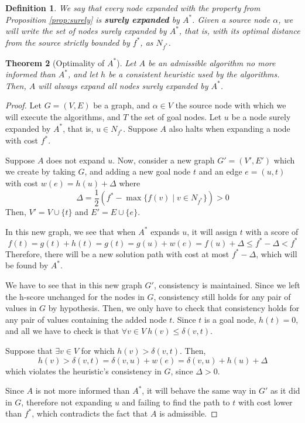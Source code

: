 \documentclass[12pt]{report}
\newtheorem{theorem}{Theorem}[chapter]
\newtheorem{definition}[theorem]{Definition}
\begin{document}
\begin{definition}
We say that every node expanded with the property from Proposition \ref{prop:surely} is \textbf{surely expanded} by $A^*$. Given a source node $\alpha$, we will write the set of nodes surely expanded by $A^*$, that is, with its optimal distance from the source strictly bounded by $f^*$, as $N_{f^*}$.
\end{definition}

\begin{theorem}[Optimality of $A^*$]
\label{thm:astar-optimality}
Let $A$ be an admissible algorithm no more informed than $A^*$, and let $h$ be a consistent heuristic used by the algorithms. Then, $A$ will always expand all nodes surely expanded by $A^*$.
\end{theorem}
\begin{proof}
Let $G = (V, E)$ be a graph, and $\alpha \in V$ the source node with which we will execute the algorithms, and $T$ the set of goal nodes. Let $u$ be a node surely expanded by $A^*$, that is, $u \in N_{f^*}$. Suppose $A$ also halts when expanding a node with cost $f^*$.

Suppose $A$ does not expand $u$. Now, consider a new graph $G' = (V', E')$ which we create by taking $G$, and adding a new goal node $t$ and an edge $e = (u, t)$ with cost $w(e) = h(u) + \Delta$ where
\[ \Delta = \frac{1}{2} (f^* - \max \{ f(v) \mid v \in N_{f^*} \}) > 0 \]
Then, $V' = V \cup \{ t 	\}$ and $E' = E \cup \{ e \}$.

In this new graph, we see that when $A^*$ expands $u$, it will assign $t$ with a score of
\[ f(t) = g(t) + h(t) = g(t) = g(u) + w(e) = f(u) + \Delta \leq f^* - \Delta < f^* \]
Therefore, there will be a new solution path with cost at most $f^* - \Delta$, which will be found by $A^*$.

We have to see that in this new graph $G'$, consistency is maintained. Since we left the h-score unchanged for the nodes in $G$, consistency still holds for any pair of values in $G$ by hypothesis. Then, we only have to check that consistency holds for any pair of values containing the added node $t$. Since $t$ is a goal node, $h(t) = 0$, and all we have to check is that $\forall v \in V \  h(v) \leq \delta(v, t)$.

Suppose that $\exists v \in V$ for which $h(v) > \delta(v, t)$. Then,
\[ h(v) > \delta(v, t) = \delta(v, u) + w(e) = \delta(v, u) + h(u) + \Delta \]
which violates the heuristic's consistency in $G$, since $\Delta > 0$.

Since $A$ is not more informed than $A^*$, it will behave the same way in $G'$ as it did in $G$, therefore not expanding $u$ and failing to find the path to $t$ with cost lower than $f^*$, which contradicts the fact that $A$ is admissible.
\end{proof}
\end{document}
